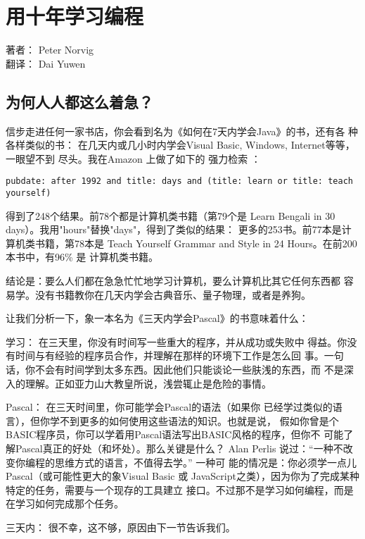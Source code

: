 \chapter{用十年学习编程}

	\begin{center}著者： Peter Norvig\\ 翻译： Dai Yuwen\cite{tenyears}\end{center}


\section{为何人人都这么着急？}


信步走进任何一家书店，你会看到名为《如何在7天内学会Java》的书，还有各 种各样类似的书： 在几天内或几小时内学会Visual Basic, Windows, Internet等等，一眼望不到 尽头。我在Amazon 上做了如下的 强力检索 ：

          \verb|pubdate: after 1992 and title: days and (title: learn or title: teach yourself)|

得到了248个结果。前78个都是计算机类书籍（第79个是 Learn Bengali in 30 days）。我用"hours"替换"days"，得到了类似的结果： 更多的253书。前77本是计算机类书籍，第78本是 Teach Yourself Grammar and Style in 24 Hours。在前200本书中，有96\% 是 计算机类书籍。

结论是：要么人们都在急急忙忙地学习计算机，要么计算机比其它任何东西都 容易学。没有书籍教你在几天内学会古典音乐、量子物理，或者是养狗。


让我们分析一下，象一本名为《三天内学会Pascal》的书意味着什么：

\begin{compactitem}
\item 学习： 在三天里，你没有时间写一些重大的程序，并从成功或失败中 得益。你没有时间与有经验的程序员合作，并理解在那样的环境下工作是怎么回 事。一句话，你不会有时间学到太多东西。因此他们只能谈论一些肤浅的东西，而 不是深入的理解。正如亚力山大教皇所说，浅尝辄止是危险的事情。
\item Pascal： 在三天时间里，你可能学会Pascal的语法（如果你 已经学过类似的语言），但你学不到更多的如何使用这些语法的知识。也就是说， 假如你曾是个BASIC程序员，你可以学着用Pascal语法写出BASIC风格的程序，但你不 可能了解Pascal真正的好处（和坏处）。那么关键是什么？ Alan Perlis 说过：“一种不改变你编程的思维方式的语言，不值得去学。” 一种可 能的情况是：你必须学一点儿Pascal（或可能性更大的象Visual Basic 或 JavaScript之类），因为你为了完成某种特定的任务，需要与一个现存的工具建立 接口。不过那不是学习如何编程，而是在学习如何完成那个任务。
\item 三天内： 很不幸，这不够，原因由下一节告诉我们。
\end{compactitem}

